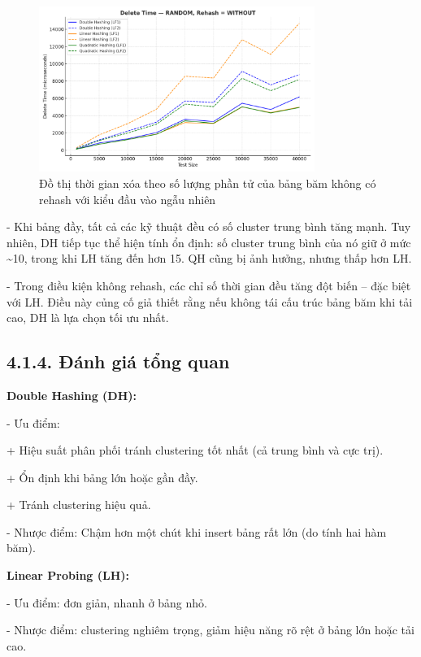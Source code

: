 \documentclass[12pt,a4paper]{report}
\begin{document}
\begin{figure}[!ht]
    \centering
    \includegraphics[width=0.8\textwidth]{ran_del_not.png}
    \caption{Đồ thị thời gian xóa theo số lượng phần tử của bảng băm không có rehash với kiểu đầu vào ngẫu nhiên}
    \label{fig:flowchart}
\end{figure}
-	Khi bảng đầy, tất cả các kỹ thuật đều có số cluster trung bình tăng mạnh. Tuy nhiên, DH tiếp tục thể hiện tính ổn định: số cluster trung bình của nó giữ ở mức \textasciitilde 10, trong khi LH tăng đến hơn 15. QH cũng bị ảnh hưởng, nhưng thấp hơn LH.

-	Trong điều kiện không rehash, các chỉ số thời gian đều tăng đột biến – đặc biệt với LH. Điều này củng cố giả thiết rằng nếu không tái cấu trúc bảng băm khi tải cao, DH là lựa chọn tối ưu nhất.
\newpage
\subsection*{4.1.4. Đánh giá tổng quan}
\noindent \indent \textbf{Double Hashing (DH):}

- Ưu điểm:

\hspace{1cm}+ Hiệu suất phân phối tránh clustering tốt nhất (cả trung bình và cực trị).

\hspace{1cm}+	Ổn định khi bảng lớn hoặc gần đầy.

\hspace{1cm}+	Tránh clustering hiệu quả.

-	Nhược điểm:	Chậm hơn một chút khi insert bảng rất lớn (do tính hai hàm băm).

	\textbf{Linear Probing (LH):}
    
-	Ưu điểm: đơn giản, nhanh ở bảng nhỏ.

-	Nhược điểm: clustering nghiêm trọng, giảm hiệu năng rõ rệt ở bảng lớn hoặc tải cao.
\end{document}
